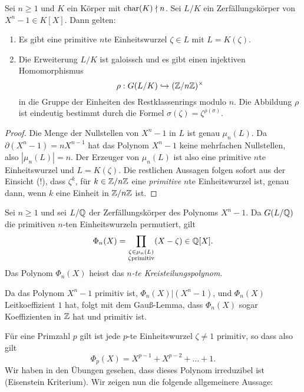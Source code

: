 \documentclass{book}
\begin{document}
\begin{prop}
    \label{prop:galoisew}
    Sei $n \ge 1$ und $K$ ein Körper mit $\operatorname{char}(K) \nmid n$. Sei $L/K$ ein Zerfällungskörper von $X^n -1 \in K[X]$. Dann gelten:
    \begin{enumerate}
        \item Es gibt eine primitive $n$te Einheitswurzel $\zeta \in L$ mit $L = K(\zeta)$. 
        \item Die Erweiterung $L/K$ ist galoissch und es gibt einen injektiven Homomorphismus
            \[
                \rho: G(L/K) \hookrightarrow (\mathbb{Z}/n\mathbb{Z})^{\times}
            \]
            in die Gruppe der Einheiten des Restklassenrings modulo $n$. Die
            Abbildung $\rho$ ist eindeutig bestimmt durch die Formel
            $\sigma(\zeta) = \zeta^{\rho(\sigma)}$. 
    \end{enumerate}
\end{prop}
\begin{proof}
    Die Menge der Nullstellen von $X^n-1$ in $L$ ist genau $\mu_n(L)$. Da
    $\partial(X^n - 1) = nX^{n-1}$ hat das Polynom $X^n - 1$ keine mehrfachen
    Nullstellen, also $|\mu_n(L)| = n$. Der Erzeuger von $\mu_n(L)$ ist also
    eine primitive $n$te Einheitswurzel und $L = K(\zeta)$. Die restlichen
    Aussagen folgen sofort aus der Einsicht (!), dass $\zeta^k$, für $k \in
    \mathbb{Z}/n\mathbb{Z}$ eine {\em primitive} $n$te Einheitswurzel ist, genau dann, wenn
    $k$ eine Einheit in $\mathbb{Z}/n\mathbb{Z}$ ist. 
\end{proof}

Sei $n \ge 1$ und sei $L/\mathbb{Q}$ der Zerfällungskörper des Polynoms $X^n -1$. Da $G(L/\mathbb{Q})$ die
primitiven $n$-ten Einheitswurzeln permutiert, gilt
\[
	\Phi_n(X) = \prod_{\substack{\zeta \in \mu_n(L) \\ \zeta \text{primitiv}}} (X- \zeta) \in
	\mathbb{Q}[X].
\]
Das Polynom $\Phi_n(X)$ heisst das {\em $n$-te Kreisteilungspolynom}. 

\begin{rem} Da das Polynom $X^n -1$ primitiv ist, $\Phi_n(X)|(X^n-1)$, und $\Phi_n(X)$ Leitkoeffizient
	$1$ hat, folgt mit dem Gauß-Lemma, dass $\Phi_n(X)$ sogar Koeffizienten in $\mathbb{Z}$ hat und
	primitiv ist. 
\end{rem}

Für eine Primzahl $p$ gilt ist jede $p$-te Einheitswurzel $\zeta \ne 1$ primitiv, so dass also gilt
\[
	\Phi_p(X) = X^{p-1} + X^{p-2} + \dots + 1.
\]
Wir haben in den Übungen gesehen, dass dieses Polynom irreduzibel ist (Eisenstein Kriterium). Wir
zeigen nun die folgende allgemeinere Aussage: 
\end{document}
